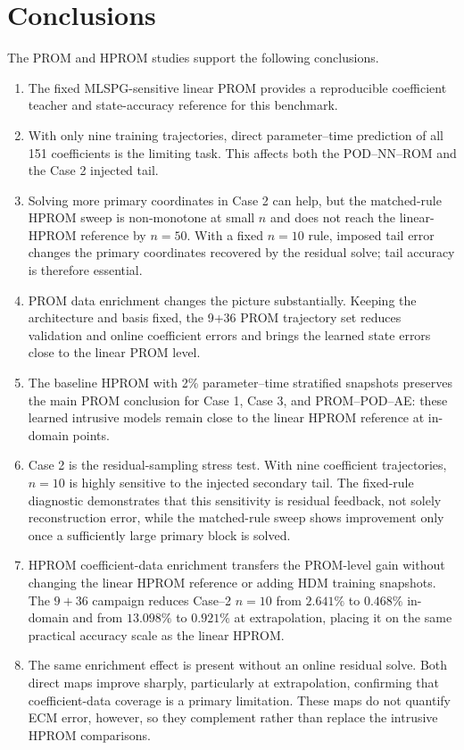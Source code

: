 \documentclass[11pt]{article}
\begin{document}
\section{Conclusions}
The PROM and HPROM studies support the following conclusions.
\begin{enumerate}
  \item The fixed MLSPG-sensitive linear PROM provides a reproducible coefficient teacher and state-accuracy
  reference for this benchmark.
  \item With only nine training trajectories, direct parameter--time prediction of all 151 coefficients is the
  limiting task.  This affects both the POD--NN--ROM and the Case 2 injected tail.
  \item Solving more primary coordinates in Case 2 can help, but the matched-rule HPROM sweep is non-monotone at
  small $n$ and does not reach the linear-HPROM reference by $n=50$.  With a fixed $n=10$ rule, imposed tail
  error changes the primary coordinates recovered by the residual solve; tail accuracy is therefore essential.
  \item PROM data enrichment changes the picture substantially.  Keeping the architecture and basis fixed, the
  9+36 PROM trajectory set reduces validation and online coefficient errors and brings the learned state errors close
  to the linear PROM level.
  \item The baseline HPROM with 2\% parameter--time stratified snapshots preserves the main PROM conclusion for
  Case 1, Case 3, and PROM--POD--AE: these learned intrusive models remain close to the linear HPROM reference at
  in-domain points.
  \item Case 2 is the residual-sampling stress test.  With nine coefficient trajectories, \(n=10\) is highly
  sensitive to the injected secondary tail.  The fixed-rule diagnostic demonstrates that this sensitivity is
  residual feedback, not solely reconstruction error, while the matched-rule sweep shows improvement only once
  a sufficiently large primary block is solved.
  \item HPROM coefficient-data enrichment transfers the PROM-level gain without changing the linear HPROM reference
  or adding HDM training snapshots.  The \(9+36\) campaign reduces Case--2 \(n=10\) from \(2.641\%\) to \(0.468\%\)
  in-domain and from \(13.098\%\) to \(0.921\%\) at extrapolation, placing it on the same practical accuracy scale as
  the linear HPROM.
  \item The same enrichment effect is present without an online residual solve.  Both direct maps improve sharply,
  particularly at extrapolation, confirming that coefficient-data coverage is a primary limitation.  These maps do
  not quantify ECM error, however, so they complement rather than replace the intrusive HPROM comparisons.
\end{enumerate}
\end{document}
